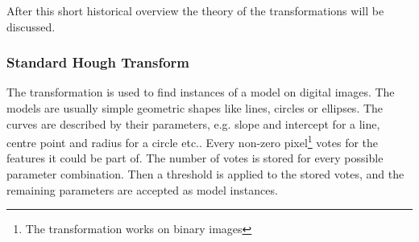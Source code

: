 After this short historical overview the theory of the transformations will be discussed.

\subsubsection{Standard Hough Transform}

The transformation is used to find instances of a model on digital images.
The models are usually simple geometric shapes like lines, circles or ellipses.
The curves are described by their parameters, e.g. slope and intercept for a line, centre point and radius for a circle etc..
Every non-zero pixel\footnote{The transformation works on binary images} votes for the features it could be part of.
The number of votes is stored for every possible parameter combination.
Then a threshold is applied to the stored votes, and the remaining parameters are accepted as model instances.
	
